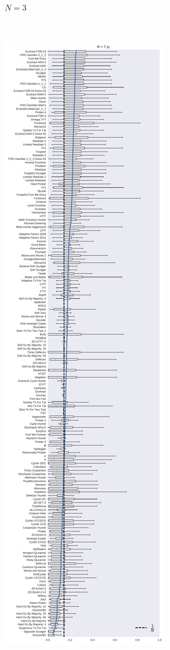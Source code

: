 \documentclass[10pt,journal]{IEEEtran}
\begin{document}
\begin{figure}[!hbtp]
\begin{subfigure}{.3\columnwidth}
        \caption{\(N=3\)}
        \label{fig:boxplot_3_invade}
    \end{subfigure}%
    ~
    \begin{subfigure}{.3\columnwidth}
        \centering
        \includegraphics[width=\columnwidth]{img/boxplot_7_invade.pdf}

\end{subfigure}
\end{figure}
\end{document}
